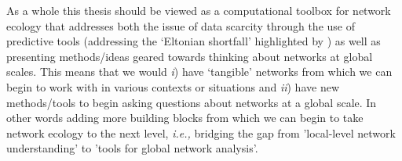 \begin{refsection}
As a whole this thesis should be viewed as a computational toolbox for
network ecology that addresses both the issue of data scarcity through
the use of predictive tools (addressing the `Eltonian shortfall' highlighted by \cite{Hortal2015Seven}) as well as presenting methods/ideas geared towards thinking about networks at global scales. This means that we would \emph{i}) have `tangible' networks from which we can begin to work with in various contexts or situations and \emph{ii}) have new methods/tools to begin asking questions about networks at a global scale. In other words adding more building blocks from which we can begin to take network ecology to the next level, \emph{i.e.,} bridging the gap from 'local-level network understanding' to 'tools for global network analysis'.

\printbibliography
\end{refsection}

\endinput
